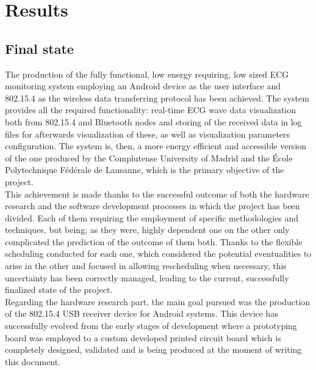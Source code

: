 \chapter{Results}
\label{cha:results}

	\section{Final state}
	\label{sec:end-state}
	


		The production of the fully functional, low energy requiring, low sized ECG monitoring system employing an Android device as the user interface and 802.15.4 as the wireless data transferring protocol has been achieved. The system provides all the required functionality: real-time ECG wave data visualization both from 802.15.4 and Bluetooth nodes and storing of the received data in log files for afterwards visualization of these, as well as visualization parameters configuration. The system is, then, a more energy efficient and accessible version of the one produced by the Complutense University of Madrid and the École Polytechnique Fédérale de Lausanne, which is the primary objective of the project.\\

		This achievement is made thanks to the successful outcome of both the hardware research and the software development processes in which the project has been divided. Each of them requiring the employment of specific methodologies and techniques, but being, as they were, highly dependent one on the other only complicated the prediction of the outcome of them both. Thanks to the flexible scheduling conducted for each one, which considered the potential eventualities to arise in the other and focused in allowing rescheduling when necessary, this uncertainty has been correctly managed, leading to the current, successfully finalized state of the project.\\
		
		Regarding the hardware research part, the main goal pursued was the production of the 802.15.4 USB receiver device for Android systems. This device has successfully evolved from the early stages of development where a prototyping board was employed to a custom developed printed circuit board which is completely designed, validated and is being produced at the moment of writing this document.\\

